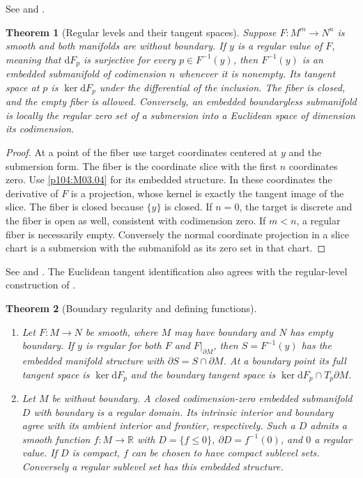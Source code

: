 \documentclass[11pt,oneside,openany]{book}
\newtheorem{theorem}{Theorem}[chapter]
\theoremstyle{definition}
\theoremstyle{remark}
\newcommand{\R}{\mathbb R}
\newcommand{\dd}{\mathrm d}
\begin{document}
See \cite[pp.~98--115, especially Theorems~5.8, 5.27, and
  5.29 and Lemma~5.34, and Theorems~5.51 and 5.53]{lee}
and \cite[Sections~9 and 11]{tu}.

\begin{theorem}[Regular levels and their tangent spaces]\label{p104:M03.05}
Suppose \(F:M^m\to N^n\) is smooth and both manifolds
are without boundary. If \(y\) is a regular value
of \(F\), meaning that \(\dd F_p\) is surjective for
every \(p\in F^{-1}(y)\), then \(F^{-1}(y)\) is an
embedded submanifold of codimension \(n\) whenever
it is nonempty. Its tangent space at \(p\) is
\(\ker\dd F_p\) under the differential of the inclusion.
The fiber is closed, and the empty fiber is allowed.
Conversely, an embedded boundaryless submanifold is
locally the regular zero set of a submersion into a
Euclidean space of dimension its codimension.
\end{theorem}

\begin{proof}
At a point of the fiber use target coordinates centered
at \(y\) and the submersion form. The fiber is the
coordinate slice with the first \(n\) coordinates zero.
Use \cref{p104:M03.04} for its embedded structure.
In these coordinates the derivative of \(F\) is a
projection, whose kernel is exactly the tangent
image of the slice. The fiber is closed because
\(\{y\}\) is closed. If \(n=0\), the target is
discrete and the fiber is open as well, consistent
with codimension zero. If \(m<n\), a regular fiber
is necessarily empty. Conversely the normal
coordinate projection in a slice chart is a
submersion with the submanifold as its zero set
in that chart.
\end{proof}

See \cite[pp.~104--108 and 115--120]{lee} and
\cite[Section~11.3]{tu}. The Euclidean tangent
identification also agrees with the regular-level
construction of \cite[Chapter~14]{d04}.

\begin{theorem}[Boundary regularity and defining functions]\label{p104:M03.06}
\begin{enumerate}[label=\textup{(\alph*)}]
\item Let \(F:M\to N\) be smooth, where \(M\) may have
  boundary and \(N\) has empty boundary. If \(y\) is
  regular for both \(F\) and \(F|_{\partial M}\), then
  \(S=F^{-1}(y)\)
  has the embedded manifold structure with
  \(\partial S=S\cap\partial M\). At a boundary
  point its full tangent space is \(\ker\dd F_p\)
  and the boundary tangent space is
  \(\ker\dd F_p\cap T_p\partial M\).
\item Let \(M\) be without boundary. A closed
  codimension-zero embedded submanifold \(D\) with
  boundary is a regular domain. Its intrinsic
  interior and boundary agree with its ambient
  interior and frontier, respectively. Such a
  \(D\) admits a smooth function \(f:M\to\R\)
  with \(D=\{f\leq0\}\), \(\partial D=f^{-1}(0)\),
  and \(0\) a regular value. If \(D\) is compact,
  \(f\) can be chosen to have compact sublevel sets.
  Conversely a regular sublevel set has this
  embedded structure.
\end{enumerate}
\end{theorem}
\end{document}
